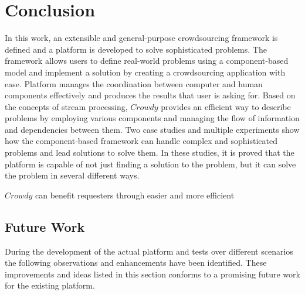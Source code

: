 \chapter{Conclusion}
\label{chap:conclusion}

In this work, an extensible and general-purpose crowdsourcing framework is defined and a platform is developed to solve sophisticated problems. The framework allows users to define real-world problems using a component-based model and implement a solution by creating a crowdsourcing application with ease. Platform manages the coordination between computer and human components effectively and produces the results that user is asking for. Based on the concepts of stream processing, $Crowdy$ provides an efficient way to describe problems by employing various components and managing the flow of information and dependencies between them. Two case studies and multiple experiments show how the component-based framework can handle complex and sophisticated problems and lead solutions to solve them. In these studies, it is proved that the platform is capable of not just finding a solution to the problem, but it can solve the problem in several different ways.

$Crowdy$ can benefit requesters through easier and more efficient

\section{Future Work}
During the development of the actual platform and tests over different scenarios the following observations and enhancements have been identified. These improvements and ideas listed in this section conforms to a promising future work for the existing platform. 

